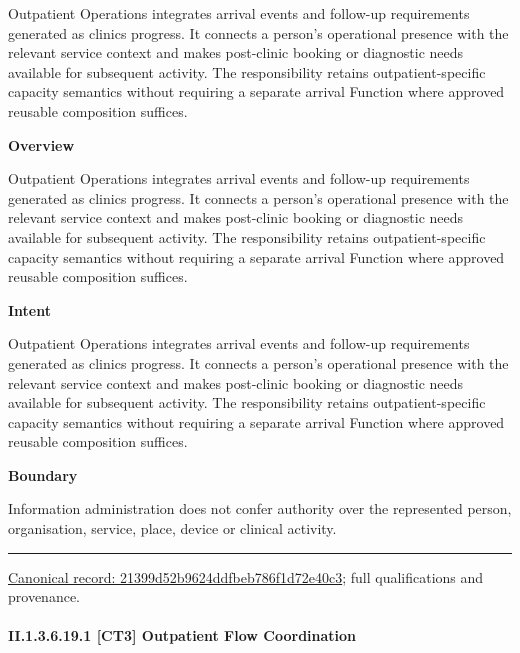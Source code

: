 Outpatient Operations integrates arrival events and follow-up requirements generated as clinics progress. It connects a person's operational presence with the relevant service context and makes post-clinic booking or diagnostic needs available for subsequent activity. The responsibility retains outpatient-specific capacity semantics without requiring a separate arrival Function where approved reusable composition suffices.



\textbf{Overview}



Outpatient Operations integrates arrival events and follow-up requirements generated as clinics progress. It connects a person's operational presence with the relevant service context and makes post-clinic booking or diagnostic needs available for subsequent activity. The responsibility retains outpatient-specific capacity semantics without requiring a separate arrival Function where approved reusable composition suffices.



\textbf{Intent}



Outpatient Operations integrates arrival events and follow-up requirements generated as clinics progress. It connects a person's operational presence with the relevant service context and makes post-clinic booking or diagnostic needs available for subsequent activity. The responsibility retains outpatient-specific capacity semantics without requiring a separate arrival Function where approved reusable composition suffices.



\textbf{Boundary}



Information administration does not confer authority over the represented person, organisation, service, place, device or clinical activity.



\medskip\hrule\medskip

{\footnotesize \href{../../../../../../../continuum/strategy/capability/21399d52b9624ddfbeb786f1d72e40c3.md}{Canonical record: 21399d52b9624ddfbeb786f1d72e40c3}; full qualifications and provenance.}\par
\paragraph*{II.1.3.6.19.1 [CT3] Outpatient Flow Coordination}
\label{navigation:II.1.3.6.19.1}

